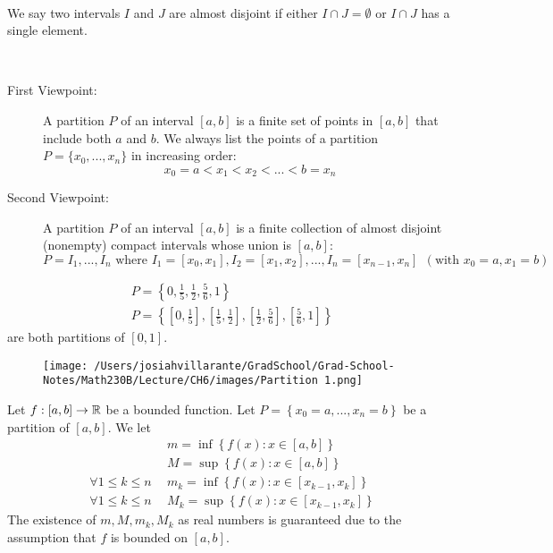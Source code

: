 \begin{definition} \leavevmode\\
    We say two intervals $I$ and $J$ are almost disjoint if either $I\cap J= \emptyset$ or $I\cap J$ has a single element.
\end{definition}

\begin{definition}[Partition] \leavevmode\\
    \begin{description}
        \item[First Viewpoint: ] A partition $P$ of an interval $[a,b]$ is a finite set of points in $[a,b]$ that include both $a$ and $b$. We always list the points of a partition $P=\{x_0, ..., x_n\}$ in increasing order:
        $$
            x_0 = a < x_1 < x_2 < ... < b = x_n
        $$
        \item[Second Viewpoint: ] A partition $P$ of an interval $[a,b]$ is a finite collection of almost disjoint (nonempty) compact intervals whose union is $[a,b]$:
        $$
        P = {I_1,..., I_n} \text{ where } I_1=[x_0, x_1], I_2=[x_1,x_2], ..., I_n = [x_{n-1}, x_n] ~~(\text{with }x_0 = a, x_1 = b)
        $$
    \end{description}
    
\end{definition}

\begin{example}
    \begin{align*}
        P = \left\{0, \frac{1}{5}, \frac{1}{2}, \frac{5}{6}, 1\right\} \\
        P = \left\{[0, \frac{1}{5}], [\frac{1}{5}, \frac{1}{2}], [\frac{1}{2}, \frac{5}{6}], [\frac{5}{6}, 1]\right\}
    \end{align*} are both partitions of $[0,1]$.
\end{example}

\begin{figure}[h]
    \texttt{[image: /Users/josiahvillarante/GradSchool/Grad-School-Notes/Math230B/Lecture/CH6/images/Partition 1.png]}
\end{figure}

\begin{notation}
Let $f:[a,b] \to \mathbb{R}$ be a bounded function. Let $P = \left\{x_0 = a, ..., x_n = b\right\}$ be a partition of $[a,b]$. We let
\begin{align*}
    &m = \inf \left\{f(x) : x \in [a,b]\right\} \\
    &M = \sup \left\{f(x) : x \in [a,b]\right\} \\
    \forall 1 \leq k \leq n ~~&m_k = \inf \left\{f(x) : x \in [x_{k-1}, x_k]\right\} \\
    \forall 1 \leq k \leq n ~~&M_k = \sup \left\{f(x) : x \in [x_{k-1}, x_k]\right\}
\end{align*}
The existence of $m, M, m_k, M_k$ as real numbers is guaranteed due to the assumption that $f$ is bounded on $[a,b]$.
\end{notation}

